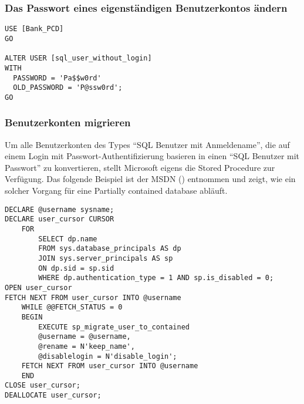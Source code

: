           \subsubsection{Das Passwort eines eigenständigen Benutzerkontos ändern}
            \begin{lstlisting}[language=ms_sql,caption={Ändern des
            Passwortes eines eigenständigen Benutzers},label=sql20_08]
USE [Bank_PCD]
GO

ALTER USER [sql_user_without_login] 
WITH 
  PASSWORD = 'Pa$$w0rd'
  OLD_PASSWORD = 'P@ssw0rd';
GO
            \end{lstlisting}
          \subsubsection{Benutzerkonten migrieren}
            Um alle Benutzerkonten des Types \enquote{SQL Benutzer mit
            Anmeldename}, die auf einem Login mit Passwort-Authentifizierung
            basieren in einen \enquote{SQL Benutzer mit Passwort} zu
            konvertieren, stellt Microsoft eigens die Stored Procedure
             zur Verfügung. Das
            folgende Beispiel ist der MSDN (\parencite{ff929139}) entnommen und
            zeigt, wie ein solcher Vorgang für eine Partially contained database
            abläuft.
\clearpage
            \begin{lstlisting}[language=ms_sql,caption={Benutzerkonten
            migrieren},label=sql20_09]
DECLARE @username sysname;  
DECLARE user_cursor CURSOR  
    FOR   
        SELECT dp.name   
        FROM sys.database_principals AS dp  
        JOIN sys.server_principals AS sp  
        ON dp.sid = sp.sid  
        WHERE dp.authentication_type = 1 AND sp.is_disabled = 0;  
OPEN user_cursor  
FETCH NEXT FROM user_cursor INTO @username  
    WHILE @@FETCH_STATUS = 0  
    BEGIN  
        EXECUTE sp_migrate_user_to_contained   
        @username = @username,  
        @rename = N'keep_name',
        @disablelogin = N'disable_login';  
    FETCH NEXT FROM user_cursor INTO @username  
    END  
CLOSE user_cursor;  
DEALLOCATE user_cursor;              
            \end{lstlisting}
            \begin{literaturinternet}
              \item \cite{ff929139}
            \end{literaturinternet}
